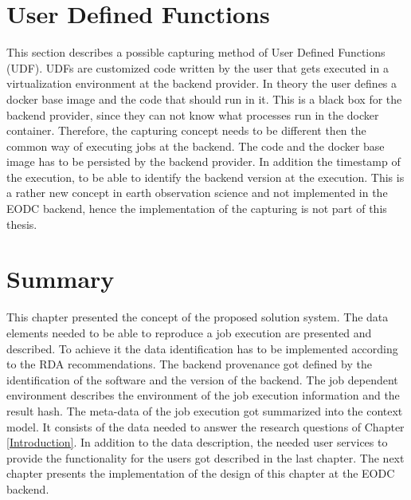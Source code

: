 \documentclass[draft,final]{vutinfth} %
\begin{document}
\section{User Defined Functions}\label{Design:User Defined Functions}
This section describes a possible capturing method of User Defined Functions (UDF). UDFs are customized code written by the user that gets executed in a virtualization environment at the backend provider. In theory the user defines a docker base image and the code that should run in it. This is a black box for the backend provider, since they can not know what processes run in the docker container. Therefore, the capturing concept needs to be different then the common way of executing jobs at the backend. The code and the docker base image has to be persisted by the backend provider. In addition the timestamp of the execution, to be able to identify the backend version at the execution. This is a rather new concept in earth observation science and not implemented in the EODC backend, hence the implementation of the capturing is not part of this thesis.

\section{Summary}
This chapter presented the concept of the proposed solution system. The data elements needed to be able to reproduce a job execution are presented and described. To achieve it the data identification has to be implemented according to the RDA recommendations. The backend provenance got defined by the identification of the software and the version of the backend. The job dependent environment describes the environment of the job execution information and the result hash. The meta-data of the job execution got summarized into the context model. It consists of the data needed to answer the research questions of Chapter \ref{Introduction}. In addition to the data description, the needed user services to provide the functionality for the users got described in the last chapter. The next chapter presents the implementation of the design of this chapter at the EODC backend.     
\end{document}

